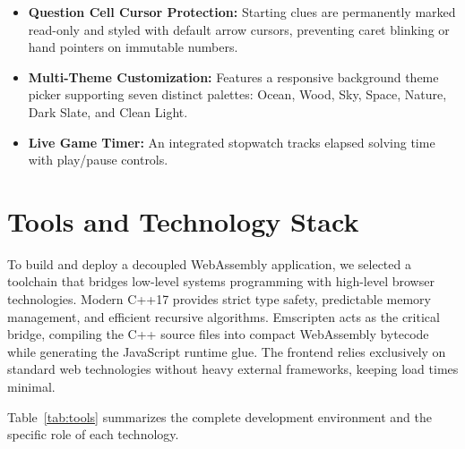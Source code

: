 \documentclass[12pt,a4paper,oneside]{book}
\begin{document}
\begin{itemize}
    \item \textbf{Question Cell Cursor Protection:} Starting clues are permanently marked read-only and styled with default arrow cursors, preventing caret blinking or hand pointers on immutable numbers.
    \item \textbf{Multi-Theme Customization:} Features a responsive background theme picker supporting seven distinct palettes: Ocean, Wood, Sky, Space, Nature, Dark Slate, and Clean Light.
    \item \textbf{Live Game Timer:} An integrated stopwatch tracks elapsed solving time with play/pause controls.
\end{itemize}

\section{Tools and Technology Stack}
To build and deploy a decoupled WebAssembly application, we selected a toolchain that bridges low-level systems programming with high-level browser technologies. Modern C++17 provides strict type safety, predictable memory management, and efficient recursive algorithms. Emscripten acts as the critical bridge, compiling the C++ source files into compact WebAssembly bytecode while generating the JavaScript runtime glue. The frontend relies exclusively on standard web technologies without heavy external frameworks, keeping load times minimal.

Table~\ref{tab:tools} summarizes the complete development environment and the specific role of each technology.
\end{document}
